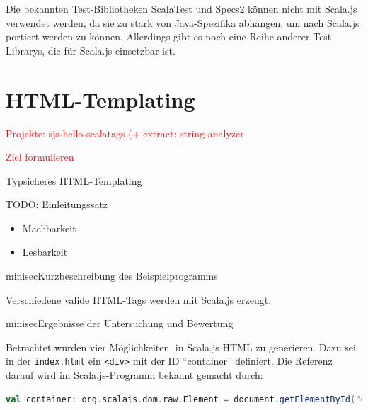 \documentclass[a4paper, 12pt, hidelinks, listof=totoc, listoftables=totoc, bibliography=totoc]{scrreprt}
\newcommand{\code}[1]{\lstinline[language=Scala, style=inline]|#1|}
\newcommand{\html}[1]{\lstinline[language=HTML5, style=inline]|#1|}
\newcommand{\TODO}[1]{\textcolor{red}{#1}\newline}
\begin{document}
Die bekannten Test-Bibliotheken ScalaTest und Specs2 können nicht mit Scala.js verwendet werden, da sie zu stark von Java-Spezifika abhängen, um nach Scala.js portiert werden zu können. Allerdings gibt es noch eine Reihe anderer Test-Librarys, die für Scala.js einsetzbar ist. \cite[\#OtherTestingLibraries]{haoyi.HOS}






\section{HTML-Templating}


\TODO{Projekte: sjs-hello-scalatags (+ extract: string-analyzer}


\TODO{Ziel formulieren}

Typsicheres \ac{HTML}-Templating 

TODO: Einleitungssatz


\begin{itemize}
	\item Machbarkeit
	\item Lesbarkeit
\end{itemize}

minisec{Kurzbeschreibung des Beispielprogramms}

Verschiedene valide \ac{HTML}-Tags werden mit Scala.js erzeugt.

minisec{Ergebnisse der Untersuchung und Bewertung}

Betrachtet wurden vier Möglichkeiten, in Scala.js \ac{HTML} zu generieren. Dazu sei in der \code{index.html} ein
\html{<div>} mit der ID "`container"' definiert. Die Referenz darauf wird im Scala.js-Programm bekannt gemacht durch:

\begin{lstlisting}[language=Scala, style=snippet]
val container: org.scalajs.dom.raw.Element = document.getElementById("container")
\end{lstlisting}
\end{document}
